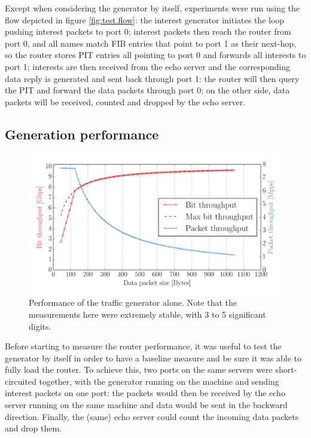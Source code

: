 \documentclass[11pt,a4paper,twoside,titlepage,openany]{book}
\begin{document}
Except when considering the generator by itself, experiments were run using the flow depicted in figure \ref{fig:test.flow}: the interest generator initiates the loop pushing interest packets to port 0; interest packets then reach the router from port 0, and all names match \gls{FIB} entries that point to port 1 as their next-hop, so the router stores \gls{PIT} entries all pointing to port 0 and forwards all interests to port 1; interests are then received from the echo server and the corresponding data reply is generated and sent back through port 1: the router will then query the \gls{PIT} and forward the data packets through port 0; on the other side, data packets will be received, counted and dropped by the echo server.
 
\subsection{Generation performance}
\begin{figure}[tb]
  \begin{center}
    \includegraphics[width=1.0\textwidth]{img/traffgen_increasing_len.pdf}
    \caption[Performance of the traffic generator alone]{Performance of the traffic generator alone. Note that the measurements here were extremely stable, with 3 to 5 significant digits.}
    \label{fig:test.traffgen-perf}
  \end{center}
\end{figure}
Before starting to measure the router performance, it was useful to test the generator by itself in order to have a baseline measure and be sure it was able to fully load the router.
To achieve this, two ports on the same servers were short-circuited together, with the generator running on the machine and sending interest packets on one port: the packets would then be received by the echo server running on the same machine and data would be sent in the backward direction. Finally, the (same) echo server could count the incoming data packets and drop them.
\end{document}
